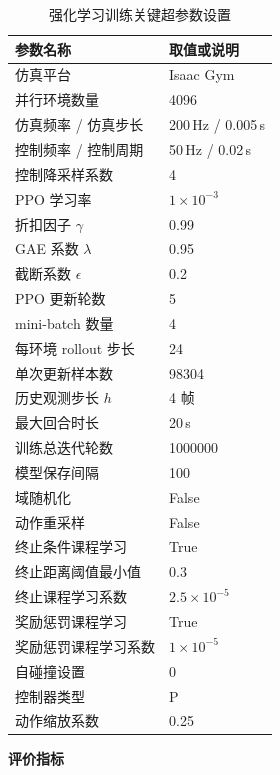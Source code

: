 \begin{table}[htbp]
  \centering
  \caption{强化学习训练关键超参数设置}
  \label{tab:training_hyperparams}
  \vspace{0.5em}\centering\wuhao
  \begin{tabular}{ll}
    \toprule
    参数名称 & 取值或说明 \\
    \midrule
    仿真平台 & Isaac Gym \\
    并行环境数量 & 4096 \\
    仿真频率 / 仿真步长 & 200\,Hz / 0.005\,s \\
    控制频率 / 控制周期 & 50\,Hz / 0.02\,s \\
    控制降采样系数 & 4 \\
    PPO 学习率 & $1\times 10^{-3}$ \\
    折扣因子 $\gamma$ & 0.99 \\
    GAE 系数 $\lambda$ & 0.95 \\
    截断系数 $\epsilon$ & 0.2 \\
    PPO 更新轮数 & 5 \\
    mini-batch 数量 & 4 \\
    每环境 rollout 步长 & 24 \\
    单次更新样本数 & 98304 \\
    历史观测步长 $h$ & 4 帧 \\
    最大回合时长 & 20\,s \\
    训练总迭代轮数 & 1000000 \\
    模型保存间隔 & 100 \\
    域随机化 & False \\
    动作重采样 & False \\
    终止条件课程学习 & True \\
    终止距离阈值最小值 & 0.3 \\
    终止课程学习系数 & $2.5\times 10^{-5}$ \\
    奖励惩罚课程学习 & True \\
    奖励惩罚课程学习系数 & $1\times 10^{-5}$ \\
    自碰撞设置 & 0 \\
    控制器类型 & P \\
    动作缩放系数 & 0.25 \\
    \bottomrule
  \end{tabular}
\end{table}

\noindent\textbf{评价指标}

